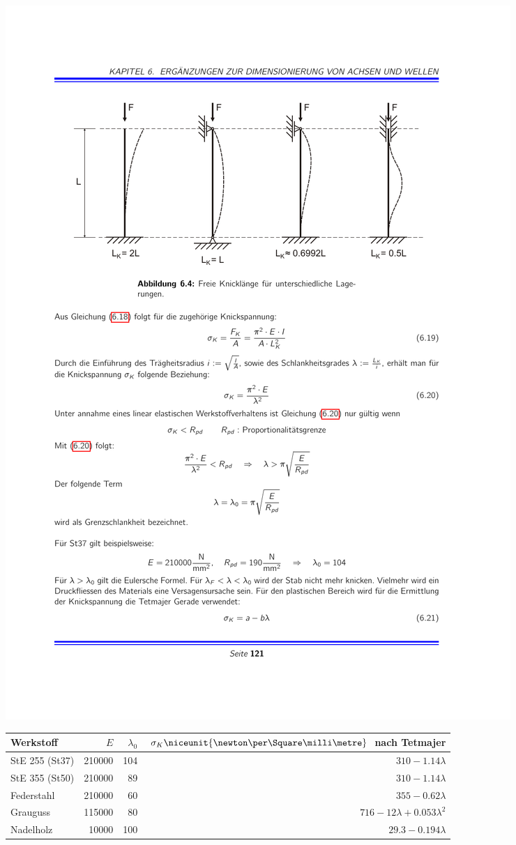 	\includegraphics[width=\columnwidth]{graphics/knick}
	
	\begin{center}
		\begin{tabular}{lrrr}
			\toprule
			Werkstoff & $E$ & $\lambda_0$ & $\sigma_K \niceunit{\newton\per\Square\milli\metre}$ nach Tetmajer \\
			\midrule
			StE 255 (St37) & 210000 & 104 & $310 - 1.14\lambda$ \\
			StE 355 (St50) & 210000 & 89 & $310 -1.14\lambda$\\
			Federstahl & 210000 & 60 &$355 - 0.62\lambda$\\
			Grauguss & 115000 & 80 & $716 - 12\lambda + 0.053 \lambda^2$\\
			Nadelholz & 10000 & 100 & $29.3 - 0.194\lambda$\\
			\bottomrule
		\end{tabular}
	\end{center}
